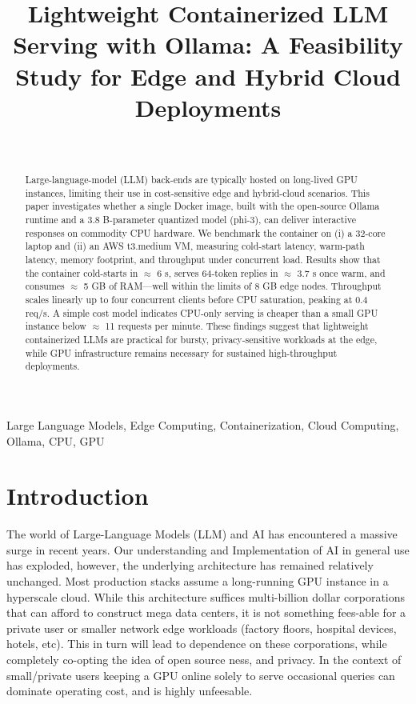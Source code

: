 \documentclass[conference]{IEEEtran}
\title{Lightweight Containerized LLM Serving with Ollama: A Feasibility Study for Edge and Hybrid Cloud Deployments}
\author{%
  \IEEEauthorblockN{Kacper Krakowiak}\\%
  \IEEEauthorblockA{South East Technological University\\%
                    Student ID: C00271692\\%
                    \texttt{C00271692@setu.ie}\\%
                    \texttt{kacper.krakowiak2002@gmail.com}}%
}
\begin{document}
\maketitle

\begin{abstract}
Large-language-model (LLM) back-ends are typically hosted on long-lived GPU instances, limiting their use in cost-sensitive edge and hybrid-cloud scenarios. This paper investigates whether a single Docker image, built with the open-source Ollama runtime and a 3.8 B-parameter quantized model (phi-3), can deliver interactive responses on commodity CPU hardware. We benchmark the container on (i) a 32-core laptop and (ii) an AWS t3.medium VM, measuring cold-start latency, warm-path latency, memory footprint, and throughput under concurrent load. Results show that the container cold-starts in \(\approx\) 6 s, serves 64-token replies in \(\approx\) 3.7 s once warm, and consumes \(\approx\) 5 GB of RAM—well within the limits of 8 GB edge nodes. Throughput scales linearly up to four concurrent clients before CPU saturation, peaking at 0.4 req/s. A simple cost model indicates CPU-only serving is cheaper than a small GPU instance below \(\approx\) 11 requests per minute. These findings suggest that lightweight containerized LLMs are practical for bursty, privacy-sensitive workloads at the edge, while GPU infrastructure remains necessary for sustained high-throughput deployments.
\end{abstract}

\begin{IEEEkeywords}
Large Language Models, Edge Computing, Containerization, Cloud Computing, Ollama, CPU, GPU
\end{IEEEkeywords}

\section{Introduction}\label{sec:intro}
The world of Large-Language Models (LLM) and AI has encountered a massive surge in recent years. Our understanding and Implementation of AI in general use has exploded, however, the underlying architecture has remained relatively unchanged. Most production stacks assume a long-running GPU instance in a hyperscale cloud. While this architecture suffices multi-billion dollar corporations that can afford to construct mega data centers, it is not something fees-able for a private user or smaller network edge workloads (factory floors, hospital devices, hotels, etc). This in turn will lead to dependence on these corporations, while completely co-opting the idea of open source ness, and privacy. In the context of small/private users keeping a GPU online solely to serve occasional queries can dominate operating cost, and is highly unfeesable.
\end{document}
